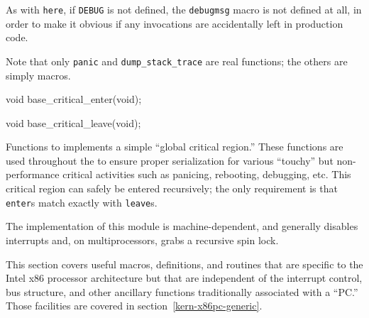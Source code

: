 \begin{apidesc}
\begin{csymlist}
		As with {\tt here}, if {\tt DEBUG} is not defined,
		the {\tt debugmsg} macro is not defined at all,
		in order to make it obvious if any invocations
		are accidentally left in production code.
	\end{csymlist}

	Note that only {\tt panic} and {\tt dump_stack_trace}
	are real functions; the others are simply macros.

\end{apidesc}

\label{base-critical-h}
\label{base-critical-enter}
\label{base-critical-leave}
\begin{apisyn}

	\funcproto void base_critical_enter(void);

	\funcproto void base_critical_leave(void);
\end{apisyn}
\begin{apidesc}
	Functions to implements a simple ``global critical region.''
	These functions are used throughout the \oskit{} to ensure
	proper serialization for various ``touchy'' but non-performance
	critical activities such as panicing, rebooting, debugging, etc.
	This critical region can safely be entered recursively;
	the only requirement is that {\tt enter}s match exactly
	with {\tt leave}s.

	The implementation of this module is machine-dependent,
	and generally disables interrupts and, on multiprocessors,
	grabs a recursive spin lock.
\end{apidesc}


\label{kern-x86-generic}

This section covers useful macros, definitions, and routines that are
specific to the Intel x86 processor architecture
but that are independent of the interrupt control, bus structure, and
other ancillary functions traditionally associated with a ``PC.''
Those facilities are covered in section~\ref{kern-x86pc-generic}.



